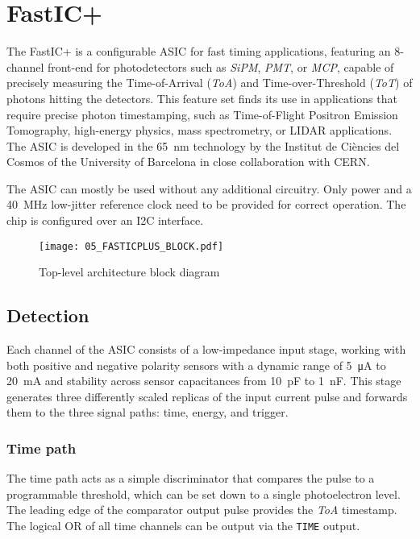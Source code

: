 \chapter{FastIC+}
\label{sec:fastic}
The FastIC+ is a configurable ASIC for fast timing applications, featuring an 8-channel front-end for photodetectors such as \emph{SiPM}, \emph{PMT}, or \emph{MCP}, capable of precisely measuring the Time-of-Arrival (\emph{ToA}) and Time-over-Threshold (\emph{ToT}) of photons hitting the detectors. This feature set finds its use in applications that require precise photon timestamping, such as Time-of-Flight Positron Emission Tomography, high-energy physics, mass spectrometry, or LIDAR applications. The ASIC is developed in the \SI{65}{\nano\meter} technology by the Institut de Ciències del Cosmos of the University of Barcelona in close collaboration with CERN. \cite{ficDatasheet}

The ASIC can mostly be used without any additional circuitry. Only power and a \SI{40}{\mega\hertz} low-jitter reference clock need to be provided for correct operation. The chip is configured over an I2C interface. \cite{ficDatasheet}

\FloatBarrier
\begin{figure}[htp!]
    \centering
    \texttt{[image: 05\_FASTICPLUS\_BLOCK.pdf]}
    \caption{Top-level architecture block diagram}
    \label{fig:fastic_top_level}
\end{figure}
\FloatBarrier



\section{Detection}
Each channel of the ASIC consists of a low-impedance input stage, working with both positive and negative polarity sensors with a dynamic range of \SI{5}{\micro\ampere} to \SI{20}{\milli\ampere} and stability across sensor capacitances from \SI{10}{\pico\farad} to \SI{1}{\nano\farad}. This stage generates three differently scaled replicas of the input current pulse and forwards them to the three signal paths: time, energy, and trigger. \cite{ficDatasheet}
%
\subsection{Time path}
The time path acts as a simple discriminator that compares the pulse to a programmable threshold, which can be set down to a single photoelectron level. The leading edge of the comparator output pulse provides the \emph{ToA} timestamp. The logical OR of all time channels can be output via the \verb|TIME| output. \cite{ficDatasheet}
%
